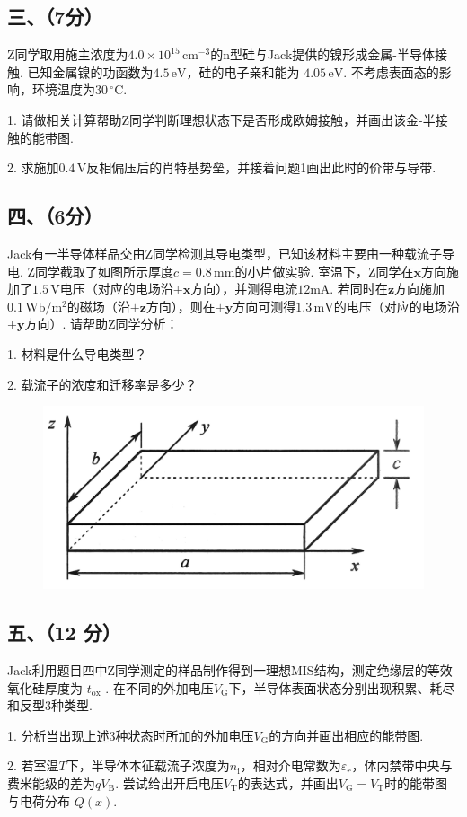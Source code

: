 \documentclass{ctexart}
\begin{document}
\vspace{3.5cm}

\subsection*{三、（7分）}



Z同学取用施主浓度为$4.0\times 10^{15} \, \text{cm}^{-3}$的n型硅与Jack提供的镍形成金属-半导体接触. 已知金属镍的功函数为$4.5\, \text{eV}$，硅的电子亲和能为 $4.05\, \text{eV}$. 不考虑表面态的影响，环境温度为30\,$^\circ $C.\par
1. 请做相关计算帮助Z同学判断理想状态下是否形成欧姆接触，并画出该金-半接触的能带图.\par
2. 求施加$0.4 \, \text{V}$反相偏压后的肖特基势垒，并接着问题1画出此时的价带与导带.\par
\vspace{4cm}

\subsection*{四、（6分）}
Jack有一半导体样品交由Z同学检测其导电类型，已知该材料主要由一种载流子导电. Z同学截取了如图所示厚度$c = 0.8 \, \text{mm}$的小片做实验. 室温下，Z同学在$\boldsymbol{x}$方向施加了$1.5 \, \text{V}$电压（对应的电场沿$+\boldsymbol{x}$方向），并测得电流$12\text{mA}$. 若同时在$\boldsymbol{z}$方向施加$0.1\, \text{Wb}/\text{m}^{2}$的磁场（沿$+\boldsymbol{z}$方向），则在$+\boldsymbol{y}$方向可测得$1.3 \, \text{mV}$的电压（对应的电场沿$+\boldsymbol{y}$方向）. 请帮助Z同学分析：\par
1. 材料是什么导电类型？\par
2. 载流子的浓度和迁移率是多少？\par


\vspace{-1.2cm}
\begin{figure}[htbp]
    \flushright
    \includegraphics[width=0.45\linewidth]{4.jpeg}
\end{figure}


\newpage
\subsection*{五、（12 分）}
Jack利用题目四中Z同学测定的样品制作得到一理想MIS结构，测定绝缘层的等效氧化硅厚度为 $ t_\text{ox}$ . 在不同的外加电压$V_\text{G}$下，半导体表面状态分别出现积累、耗尽和反型3种类型.\par
1. 分析当出现上述3种状态时所加的外加电压$V_\text{G}$的方向并画出相应的能带图.\par
2. 若室温$T$下，半导体本征载流子浓度为$n_\text{i}$，相对介电常数为$\varepsilon_r$，体内禁带中央与费米能级的差为$qV_\text{B}$. 尝试给出开启电压$V_\text{T}$的表达式，并画出$V_\text{G} = V_\text{T}$时的能带图与电荷分布 $Q(x)$. \par
\end{document}
